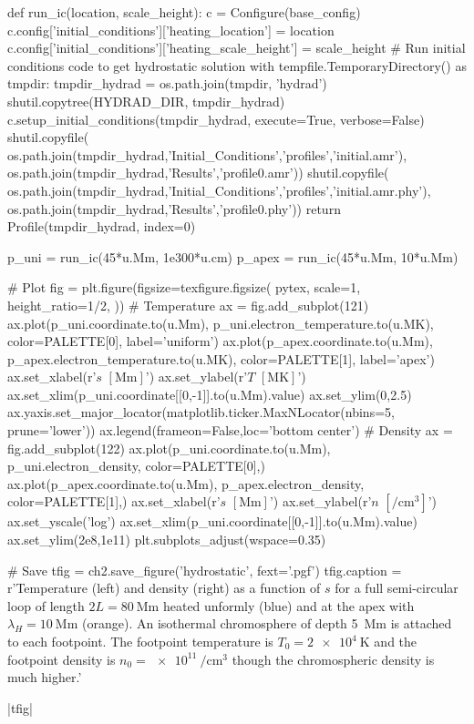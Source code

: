 \begin{pycode}[chapter2]
def run_ic(location, scale_height):
    c = Configure(base_config)
    c.config['initial_conditions']['heating_location'] = location
    c.config['initial_conditions']['heating_scale_height'] = scale_height
    # Run initial conditions code to get hydrostatic solution
    with tempfile.TemporaryDirectory() as tmpdir:
        tmpdir_hydrad = os.path.join(tmpdir, 'hydrad')
        shutil.copytree(HYDRAD_DIR, tmpdir_hydrad)
        c.setup_initial_conditions(tmpdir_hydrad, execute=True, verbose=False)
        shutil.copyfile(
            os.path.join(tmpdir_hydrad,'Initial_Conditions','profiles','initial.amr'),
            os.path.join(tmpdir_hydrad,'Results','profile0.amr'))
        shutil.copyfile(
            os.path.join(tmpdir_hydrad,'Initial_Conditions','profiles','initial.amr.phy'),
            os.path.join(tmpdir_hydrad,'Results','profile0.phy'))
        return Profile(tmpdir_hydrad, index=0)
        
p_uni = run_ic(45*u.Mm, 1e300*u.cm)
p_apex = run_ic(45*u.Mm, 10*u.Mm)

# Plot
fig = plt.figure(figsize=texfigure.figsize(
    pytex,
    scale=1,
    height_ratio=1/2,
))
# Temperature
ax = fig.add_subplot(121)
ax.plot(p_uni.coordinate.to(u.Mm), p_uni.electron_temperature.to(u.MK),
        color=PALETTE[0], label='uniform')
ax.plot(p_apex.coordinate.to(u.Mm), p_apex.electron_temperature.to(u.MK),
        color=PALETTE[1], label='apex')
ax.set_xlabel(r'$s$ $[\si{\mega\m}]$')
ax.set_ylabel(r'$T$ $[\si{\mega\kelvin}]$')
ax.set_xlim(p_uni.coordinate[[0,-1]].to(u.Mm).value)
ax.set_ylim(0,2.5)
ax.yaxis.set_major_locator(matplotlib.ticker.MaxNLocator(nbins=5, prune='lower'))
ax.legend(frameon=False,loc='bottom center')
# Density
ax = fig.add_subplot(122)
ax.plot(p_uni.coordinate.to(u.Mm), p_uni.electron_density, color=PALETTE[0],)
ax.plot(p_apex.coordinate.to(u.Mm), p_apex.electron_density, color=PALETTE[1],)
ax.set_xlabel(r'$s$ $[\si{\mega\m}]$')
ax.set_ylabel(r'$n$ $[\si{\per\cubic\cm}]$')
ax.set_yscale('log')
ax.set_xlim(p_uni.coordinate[[0,-1]].to(u.Mm).value)
ax.set_ylim(2e8,1e11)
plt.subplots_adjust(wspace=0.35)

# Save
tfig = ch2.save_figure('hydrostatic', fext='.pgf')
tfig.caption = r'Temperature (left) and density (right) as a function of $s$ for a full semi-circular loop of length $2L=\SI{80}{\mega\m}$ heated unformly (blue) and at the apex with $\lambda_H=\SI{10}{\mega\m}$ (orange). An isothermal chromosphere of depth \SI{5}{\mega\m} is attached to each footpoint. The footpoint temperature is $T_0=\SI{2e4}{\kelvin}$ and the footpoint density is $n_0=\SI{e11}{\per\cubic\cm}$ though the chromospheric density is much higher.'
\end{pycode}
\py[chapter2]|tfig|

